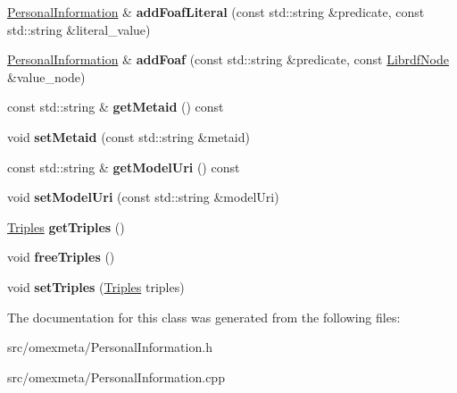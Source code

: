 \begin{DoxyCompactItemize}
\hyperlink{classomexmeta_1_1PersonalInformation}{Personal\+Information} \& {\bfseries add\+Foaf\+Literal} (const std\+::string \&predicate, const std\+::string \&literal\+\_\+value)
\item 
\mbox{\label{classomexmeta_1_1PersonalInformation_a99198226df0c8acfdd7bc30ff7c4bf8b}} 
\hyperlink{classomexmeta_1_1PersonalInformation}{Personal\+Information} \& {\bfseries add\+Foaf} (const std\+::string \&predicate, const \hyperlink{classredland_1_1LibrdfNode}{Librdf\+Node} \&value\+\_\+node)
\item 
\mbox{\label{classomexmeta_1_1PersonalInformation_ae00bfe55d51745ac11f37986443feb28}} 
const std\+::string \& {\bfseries get\+Metaid} () const
\item 
\mbox{\label{classomexmeta_1_1PersonalInformation_a2bf7f31511c545eb0158643645115b00}} 
void {\bfseries set\+Metaid} (const std\+::string \&metaid)
\item 
\mbox{\label{classomexmeta_1_1PersonalInformation_a6b2ce3a6c724b67afe3d0c2df00bb484}} 
const std\+::string \& {\bfseries get\+Model\+Uri} () const
\item 
\mbox{\label{classomexmeta_1_1PersonalInformation_afc5f378fc98d02112a9a569f4388552e}} 
void {\bfseries set\+Model\+Uri} (const std\+::string \&model\+Uri)
\item 
\mbox{\label{classomexmeta_1_1PersonalInformation_aecc5783753b41ed88a49c5b3bce82ba4}} 
\hyperlink{classomexmeta_1_1Triples}{Triples} {\bfseries get\+Triples} ()
\item 
\mbox{\label{classomexmeta_1_1PersonalInformation_aea3a34c765f176a3d6f6b88a6b8c8369}} 
void {\bfseries free\+Triples} ()
\item 
\mbox{\label{classomexmeta_1_1PersonalInformation_a25a1e9ba56dda2459cb1bbbe61cc4346}} 
void {\bfseries set\+Triples} (\hyperlink{classomexmeta_1_1Triples}{Triples} triples)
\end{DoxyCompactItemize}


The documentation for this class was generated from the following files\+:\begin{DoxyCompactItemize}
\item 
src/omexmeta/Personal\+Information.\+h\item 
src/omexmeta/Personal\+Information.\+cpp\end{DoxyCompactItemize}
